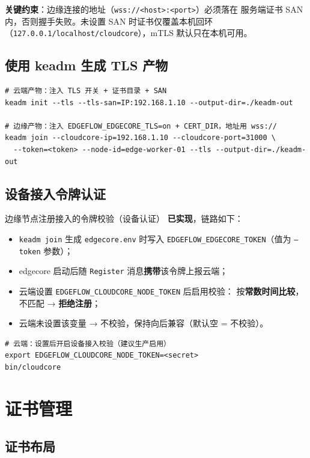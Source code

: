 \textbf{关键约束}：边缘连接的地址（\texttt{wss://<host>:<port>}）必须落在
服务端证书 SAN 内，否则握手失败。未设置 SAN 时证书仅覆盖本机回环
（\texttt{127.0.0.1/localhost/cloudcore}），mTLS 默认只在本机可用。

\subsection{使用 keadm 生成 TLS 产物}

\begin{lstlisting}
# 云端产物：注入 TLS 开关 + 证书目录 + SAN
keadm init --tls --tls-san=IP:192.168.1.10 --output-dir=./keadm-out

# 边缘产物：注入 EDGEFLOW_EDGECORE_TLS=on + CERT_DIR，地址用 wss://
keadm join --cloudcore-ip=192.168.1.10 --cloudcore-port=31000 \
  --token=<token> --node-id=edge-worker-01 --tls --output-dir=./keadm-out
\end{lstlisting}

\subsection{设备接入令牌认证}

边缘节点注册接入的令牌校验（设备认证）
\textbf{已实现}，链路如下：

\begin{itemize}
  \item \texttt{keadm join} 生成 \texttt{edgecore.env} 时写入
        \texttt{EDGEFLOW\_EDGECORE\_TOKEN}（值为 \texttt{--token} 参数）；
  \item edgecore 启动后随 \texttt{Register} 消息\textbf{携带}该令牌上报云端；
  \item 云端设置 \texttt{EDGEFLOW\_CLOUDCORE\_NODE\_TOKEN} 后启用校验：
        按\textbf{常数时间比较}，不匹配 → \textbf{拒绝注册}；
  \item 云端未设置该变量 → 不校验，保持向后兼容（默认空 = 不校验）。
\end{itemize}

\begin{lstlisting}
# 云端：设置后开启设备接入校验（建议生产启用）
export EDGEFLOW_CLOUDCORE_NODE_TOKEN=<secret>
bin/cloudcore
\end{lstlisting}

\section{证书管理}

\subsection{证书布局}

